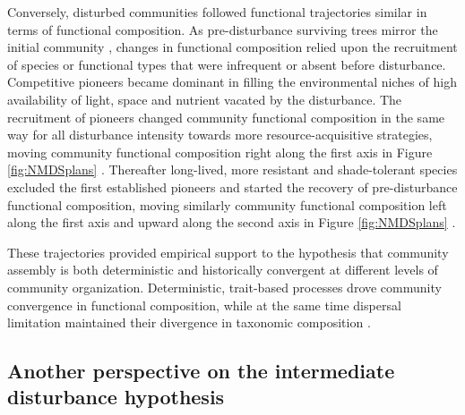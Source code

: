 \documentclass[fleqn,10pt]{ArtEcoFoG} %
\begin{document}
Conversely, disturbed communities followed functional trajectories
similar in terms of functional composition. As pre-disturbance surviving
trees mirror the initial community \citep{Herault2018}, changes in
functional composition relied upon the recruitment of species or
functional types that were infrequent or absent before disturbance.
Competitive pioneers became dominant in filling the environmental niches
of high availability of light, space and nutrient vacated by the
disturbance. The recruitment of pioneers changed community functional
composition in the same way for all disturbance intensity towards more
resource-acquisitive strategies, moving community functional composition
right along the first axis in Figure \ref{fig:NMDSplans}
\citep{Grime1998, Westoby1998, Wright2004, Reich2014}. Thereafter
long-lived, more resistant and shade-tolerant species excluded the first
established pioneers and started the recovery of pre-disturbance
functional composition, moving similarly community functional
composition left along the first axis and upward along the second axis
in Figure \ref{fig:NMDSplans} .

These trajectories provided empirical support to the hypothesis that
community assembly is both deterministic and historically convergent at
different levels of community organization. Deterministic, trait-based
processes drove community convergence in functional composition, while
at the same time dispersal limitation maintained their divergence in
taxonomic composition \citep{Fukami2005}.

\subsection{Another perspective on the intermediate disturbance
hypothesis}\label{another-perspective-on-the-intermediate-disturbance-hypothesis}
\end{document}
